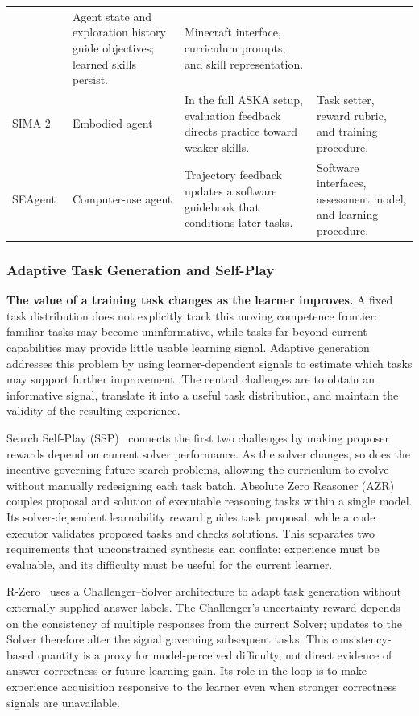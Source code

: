 \begin{table}[t]
\begin{tabularx}{\textwidth}{@{}
>{\raggedright\arraybackslash}p{}
>{\raggedright\arraybackslash}p{}
>{\raggedright\arraybackslash}p{}
>{\raggedright\arraybackslash}X
@{}}
& Agent state and exploration history guide objectives; learned skills persist.
& Minecraft interface, curriculum prompts, and skill representation.\\
SIMA 2~\cite{deepmind2025sima2}
& Embodied agent
& In the full ASKA setup, evaluation feedback directs practice toward weaker skills.
& Task setter, reward rubric, and training procedure.\\
SEAgent~\cite{sun2026seagent}
& Computer-use agent
& Trajectory feedback updates a software guidebook that conditions later tasks.
& Software interfaces, assessment model, and learning procedure.\\
\bottomrule
\end{tabularx}
\end{table}

\subsubsection{Adaptive Task Generation and Self-Play}

\noindent\textbf{The value of a training task changes as the learner improves.}
A fixed task distribution does not explicitly track this moving competence
frontier: familiar tasks may become uninformative, while tasks far beyond
current capabilities may provide little usable learning signal.
Adaptive generation addresses this problem by using learner-dependent
signals to estimate which tasks may support further improvement.
The central challenges are to obtain an informative signal, translate it
into a useful task distribution, and maintain the validity of the resulting
experience.

Search Self-Play (SSP)~\cite{lu2026searchselfplay} connects the first two
challenges by making proposer rewards depend on current solver performance.
As the solver changes, so does the incentive governing future search
problems, allowing the curriculum to evolve without manually redesigning
each task batch.
Absolute Zero Reasoner (AZR)~\cite{zhao2025absolutezero} couples proposal and
solution of executable reasoning tasks within a single model.
Its solver-dependent learnability reward guides task proposal, while a code
executor validates proposed tasks and checks solutions.
This separates two requirements that unconstrained synthesis can conflate:
experience must be evaluable, and its difficulty must be useful for the
current learner.

R-Zero~\cite{huang2026rzero} uses a Challenger--Solver architecture to adapt
task generation without externally supplied answer labels.
The Challenger's uncertainty reward depends on the consistency of multiple
responses from the current Solver; updates to the Solver therefore alter
the signal governing subsequent tasks.
This consistency-based quantity is a proxy for model-perceived difficulty,
not direct evidence of answer correctness or future learning gain.
Its role in the loop is to make experience acquisition responsive to the
learner even when stronger correctness signals are unavailable.

